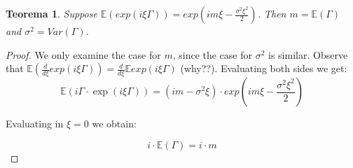 \documentclass[11pt,a4paper]{article}
\newtheorem{theorem}{Teorema}
\theoremstyle{definition}
\theoremstyle{remark}
\begin{document}
\begin{theorem}

	Suppose $\mathbb{E}(exp(i \xi \Gamma)) = exp(i m \xi - \frac{\sigma^2 \xi^2}{2})$. Then $m = \mathbb{E}(\Gamma)$ and $\sigma^2 = Var(\Gamma)$.

\end{theorem}




\begin{proof}

	We only examine the case for $m$, since the case for $\sigma^2$ is similar.
	Observe that $\mathbb{E}(\frac{d}{d\xi} exp(i \xi \Gamma)) = \frac{d}{d\xi} \mathbb{E} exp(i \xi \Gamma)$ (why??).
	Evaluating both sides we get:
	\[
		\mathbb{E}(i \Gamma \cdot \exp(i \xi \Gamma)) = (i m - \sigma^2 \xi) \cdot exp(i m \xi - \frac{\sigma^2 \xi^2}{2})
	\]

	Evaluating in $\xi = 0$ we obtain:

	\[
		i \cdot \mathbb{E}(\Gamma) = i \cdot m
	\]


\end{proof}
\end{document}
